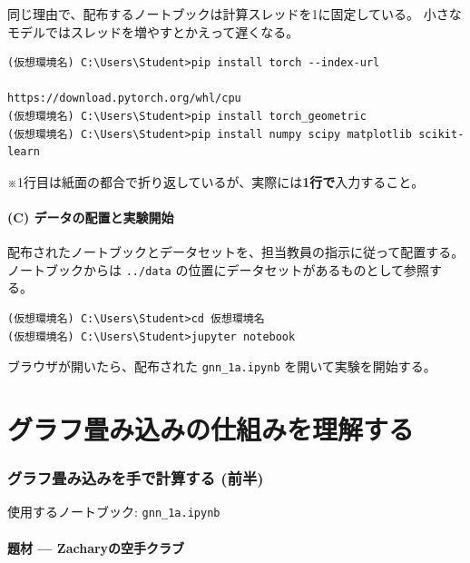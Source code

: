 \documentclass[11pt,a4paper]{jsarticle}
\begin{document}
同じ理由で、配布するノートブックは計算スレッドを1に固定している。
小さなモデルではスレッドを増やすとかえって遅くなる。

\begin{screen}
\begin{small}
\begin{verbatim}
(仮想環境名) C:\Users\Student>pip install torch --index-url
                                   https://download.pytorch.org/whl/cpu
(仮想環境名) C:\Users\Student>pip install torch_geometric
(仮想環境名) C:\Users\Student>pip install numpy scipy matplotlib scikit-learn
\end{verbatim}
\end{small}
\end{screen}

\noindent
※1行目は紙面の都合で折り返しているが、実際には\textbf{1行で}入力すること。

\subsection*{(C) データの配置と実験開始}

配布されたノートブックとデータセットを、担当教員の指示に従って配置する。
ノートブックからは \verb|../data| の位置にデータセットがあるものとして参照する。

\begin{screen}
\begin{small}
\begin{verbatim}
(仮想環境名) C:\Users\Student>cd 仮想環境名
(仮想環境名) C:\Users\Student>jupyter notebook
\end{verbatim}
\end{small}
\end{screen}

\noindent
ブラウザが開いたら、配布された \verb|gnn_1a.ipynb| を開いて実験を開始する。

\part{グラフ畳み込みの仕組みを理解する}

\section{グラフ畳み込みを手で計算する (前半)}

使用するノートブック: \verb|gnn_1a.ipynb|

\subsection{題材 --- Zacharyの空手クラブ}
\end{document}
